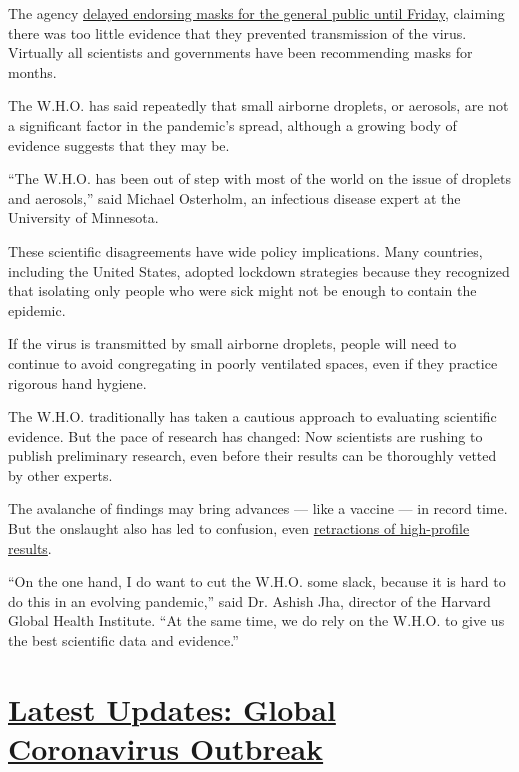 The agency
\href{https://www.nytimes.com/2020/06/05/health/coronavirus-masks-who.html}{delayed
endorsing masks for the general public until Friday}, claiming there was
too little evidence that they prevented transmission of the virus.
Virtually all scientists and governments have been recommending masks
for months.

The W.H.O. has said repeatedly that small airborne droplets, or
aerosols, are not a significant factor in the pandemic's spread,
although a growing body of evidence suggests that they may be.

``The W.H.O. has been out of step with most of the world on the issue of
droplets and aerosols,'' said Michael Osterholm, an infectious disease
expert at the University of Minnesota.

These scientific disagreements have wide policy implications. Many
countries, including the United States, adopted lockdown strategies
because they recognized that isolating only people who were sick might
not be enough to contain the epidemic.

If the virus is transmitted by small airborne droplets, people will need
to continue to avoid congregating in poorly ventilated spaces, even if
they practice rigorous hand hygiene.

The W.H.O. traditionally has taken a cautious approach to evaluating
scientific evidence. But the pace of research has changed: Now
scientists are rushing to publish preliminary research, even before
their results can be thoroughly vetted by other experts.

The avalanche of findings may bring advances --- like a vaccine --- in
record time. But the onslaught also has led to confusion, even
\href{https://www.nytimes.com/2020/06/04/health/coronavirus-hydroxychloroquine.html}{retractions
of high-profile results}.

``On the one hand, I do want to cut the W.H.O. some slack, because it is
hard to do this in an evolving pandemic,'' said Dr. Ashish Jha, director
of the Harvard Global Health Institute. ``At the same time, we do rely
on the W.H.O. to give us the best scientific data and evidence.''

\hypertarget{latest-updates-global-coronavirus-outbreak}{%
\section{\texorpdfstring{\href{https://www.nytimes.com/2020/08/01/world/coronavirus-covid-19.html?action=click\&pgtype=Article\&state=default\&region=MAIN_CONTENT_1\&context=storylines_live_updates}{Latest
Updates: Global Coronavirus
Outbreak}}{Latest Updates: Global Coronavirus Outbreak}}\label{latest-updates-global-coronavirus-outbreak}}

